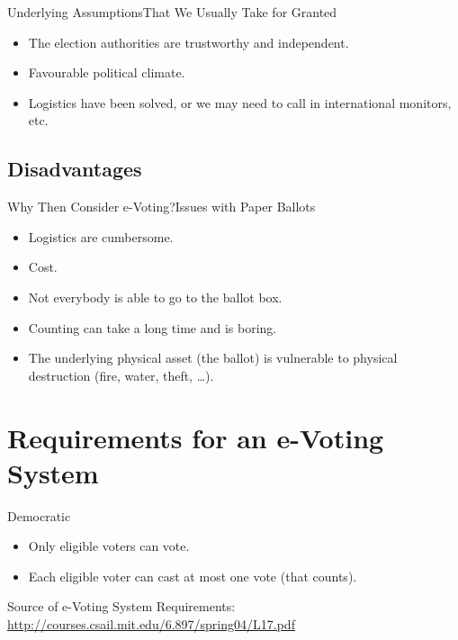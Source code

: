 \documentclass[utf8]{beamer}
\begin{document}
\begin{frame}{Underlying Assumptions}{That We Usually Take for Granted}

  \begin{itemize}
  \item<1->The election authorities are trustworthy and independent.
  \item<2->Favourable political climate.
  \item<3->Logistics have been solved,  or we may need to call in
    international monitors, etc.
  \end{itemize}

\end{frame}

\subsection{Disadvantages}

\begin{frame}{Why Then Consider e-Voting?}{Issues with Paper Ballots}

  \begin{itemize}
  \item Logistics are cumbersome.
  \item Cost.
  \item Not everybody is able to go to the ballot box.
  \item Counting can take a long time and is boring.
  \item The underlying physical asset (the ballot) is vulnerable to
    physical destruction (fire, water, theft, \ldots).
  \end{itemize}

\end{frame}

\section{Requirements for an e-Voting System}

\begin{frame}{Democratic}

  \begin{itemize}
  \item Only eligible voters can vote.
  \item Each eligible voter can cast at most one vote (that counts).
  \end{itemize}

\vfill

Source of e-Voting System Requirements:
\url{http://courses.csail.mit.edu/6.897/spring04/L17.pdf}

\end{frame}
\end{document}
